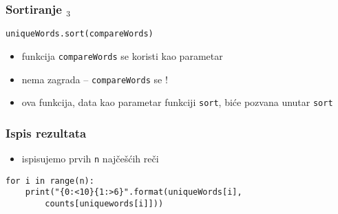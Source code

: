 \documentclass[utf8,compress]{beamer}
\begin{document}
\begin{frame}[fragile]
  \frametitle{Sortiranje $_3$}
\begin{verbatim}
uniqueWords.sort(compareWords)
\end{verbatim}
  \begin{itemize}
    \item funkcija \texttt{compareWords} se koristi kao parametar
    \item nema zagrada -- \texttt{compareWords} se !
    \item ova funkcija, data kao parametar funkciji \texttt{sort}, biće pozvana unutar \texttt{sort}
  \end{itemize}
\end{frame}

\begin{frame}[fragile]
  \frametitle{Ispis rezultata}
  \begin{itemize}
    \item ispisujemo prvih \texttt{n} najčešćih reči
  \end{itemize}
\begin{verbatim}
for i in range(n):
    print("{0:<10}{1:>6}".format(uniqueWords[i], 
        counts[uniquewords[i]]))
\end{verbatim}
\end{frame}
\end{document}
